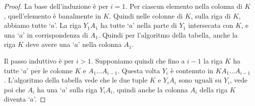 \begin{proof}
La base dell'induzione \`e per $i = 1$. Per ciascun elemento nella colonna di $K$, quell'elemento \`e banalmente in $K$. Quindi nelle colonne di $K$, sulla riga di $K$, abbiamo tutte `$a$'. La riga $Y_1 A_1$ ha tutte `$a$' nella parte di $Y_1$ intersecata con $K$, e una `$a$' in corrispondenza di $A_1$. Quindi per l'algoritmo della tabella, anche la riga $K$ deve avere una `$a$' nella colonna $A_1$.

Il passo induttivo \`e per $i > 1$. Supponiamo quindi che fino a $i-1$ la riga $K$ ha tutte `$a$' per le colonne $K$ e $A_1 \dots A_{i - 1}$. Questa volta $Y_i$ \`e contenuto in $K A_1 \dots A_{i-1}$. L'algoritmo della tabella vede che le due tuple $K$ e $Y_i A_i$ sono uguali su $Y_i$, vede poi che $A_i$ ha una `$a$' sulla riga $Y_i A_i$, quindi anche la colonna $A_i$ della riga $K$ diventa `$a$'.
\end{proof}

